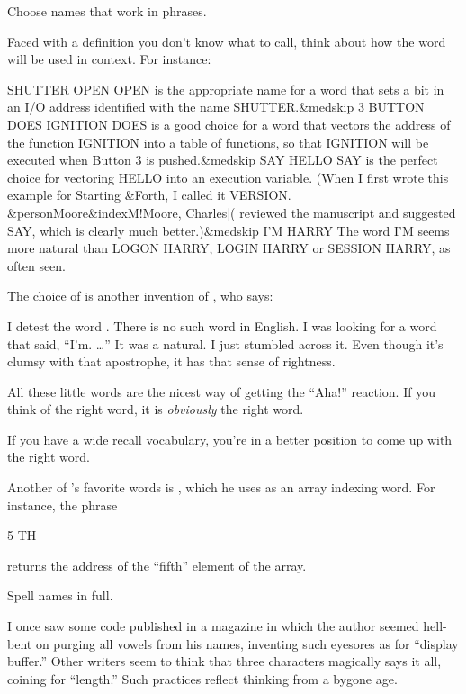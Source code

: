 \begin{tip}
Choose names that work in phrases.
\end{tip}
Faced with a definition you don't know what to call, think about how the
word will be used in context.  For instance:
\begin{Code}[fontfamily=cmss,commandchars=\&\{\}]
SHUTTER OPEN
  OPEN is the appropriate name for a word that sets a
  bit in an I/O address identified with the name
  SHUTTER.&medskip
3 BUTTON DOES IGNITION
  DOES is a good choice for a word that vectors the
  address of the function IGNITION into a table of
  functions, so that IGNITION will be executed when
  Button 3 is pushed.&medskip
SAY HELLO
  SAY is the perfect choice for vectoring HELLO into an
  execution variable.  (When I first wrote this example
  for Starting &Forth{}, I called it VERSION. &person{Moore}&index{M!Moore, Charles|(}
  reviewed the manuscript and suggested SAY, which is
  clearly much better.)&medskip
I'M HARRY
  The word I'M seems more natural than LOGON HARRY,
  LOGIN HARRY or SESSION HARRY, as often seen.
\end{Code}

\begin{interview}
The choice of  is another invention of , who
says:

\begin{tfquot}
I detest the word . There is no such word in English.  I
was looking for a word that said, ``I'm. \dots{}'' It was a natural.
I just stumbled across it.  Even though it's clumsy with that
apostrophe, it has that sense of rightness.

All these little words are the nicest way of getting the ``Aha!''
reaction.  If you think of the right word, it is \emph{obviously} the
right word.

If you have a wide recall vocabulary, you're in a better position to
come up with the right word.
\end{tfquot}
\end{interview}

Another of 's favorite words is , which he
uses as an array indexing word.  For instance, the phrase
\begin{Code}
5 TH
\end{Code}
returns the address of the ``fifth'' element of the array.

\begin{tip}
Spell names in full.
\end{tip}
I once saw some \Forth{} code published in a magazine in which the
author seemed hell-bent on purging all vowels from his names,
inventing such eyesores as  for ``display buffer.''
Other writers seem to think that three characters magically says it
all, coining  for ``length.'' Such practices reflect
thinking from a bygone age.

